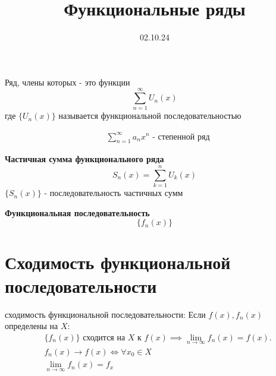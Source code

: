 

\title{Функциональные ряды}
\date{02.10.24}


\maketitle

\begin{opr}
    Ряд, члены которых - это функции
    \begin{equation}
        \sum_{n = 1}^{\infty} U_{n}(x)
    \end{equation}
    где \(\{U_{n}(x)\}\) называется функциональной последовательностью 
\end{opr}

\begin{ex}
    \begin{equation}
        \begin{align*}
            &\sum_{n = 1}^{\infty} a_{n}x^{n} \text{  - степенной ряд}
        \end{align*}
    \end{equation}
\end{ex}

\begin{opr}
    \textbf{Частичная сумма функционального ряда}
    \begin{equation}
        S_{n}(x) = \sum_{k = 1}^{n}U_{k}(x)
    \end{equation}
    \(\{S_{n}(x)\}\) - последовательность частичных сумм 
\end{opr}

\begin{opr}
    \textbf{Функциональная последовательность}
    \begin{equation}
        \{f_{n}(x)\}
    \end{equation}
\end{opr}



\section{Сходимость функциональной последовательности}

\begin{opr}
    сходимость функциональной последовательности:
    Если \(f(x), f_{n}(x)\) определены на \(X\):
    \begin{equation}
        \begin{align*}
            &\{f_{n}(x)\} \text{ сходится на } X \text{ к } f(x) 
            \implies\lim_{n\to\infty} f_{n}(x) = f(x).\\
            &f_{n}(x)\to f(x) \Leftrightarrow \forall x_{0}\in X\\
            &\lim_{n\to\infty} f_{n}(x) = f_{x}
        \end{align*}
    \end{equation}
\end{opr}


